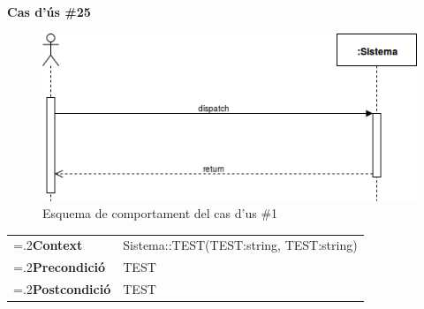 \clearpage
\noindent\textbf{\large Cas d'ús \#25}\\
\begin{figure}[H]
\centering
\includegraphics[scale=0.6]{Figures/casdus_00.png}
\caption{Esquema de comportament del cas d'us \#1}
\end{figure}
\begin{table}[h]
\noindent
\begin{tabularx}{\linewidth}{
>{\hsize=.2\hsize}X%
>{\hsize=0.8\hsize}X%
}
\textbf{Context} 		& Sistema::TEST(TEST:string, TEST:string) \\
\textbf{Precondició} 	& TEST \\
\textbf{Postcondició}	& TEST \\
\end{tabularx}
\label{}
\end{table}